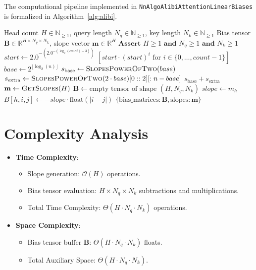 \documentclass[11pt,a4paper]{article}
\theoremstyle{definition}
\begin{document}
The computational pipeline implemented in \texttt{NnAlgoAlibiAttentionLinearBiases} is formalized in Algorithm~\ref{alg:alibi}.

\begin{algorithm}[H]
\caption{ALiBi Bias Tensor Evaluation}
\label{alg:alibi}
\begin{algorithmic}[1]
\Require Head count $H \in \mathbb{N}_{\ge 1}$, query length $N_q \in \mathbb{N}_{\ge 1}$, key length $N_k \in \mathbb{N}_{\ge 1}$
\Ensure Bias tensor $\mathbf{B} \in \mathbb{R}^{H \times N_q \times N_k}$, slope vector $\mathbf{m} \in \mathbb{R}^H$
\State $\textbf{Assert } H \ge 1 \textbf{ and } N_q \ge 1 \textbf{ and } N_k \ge 1$
        \State $start \gets 2.0^{-\left(2.0^{-(\log_2(count) - 3)}\right)}$
        \State \Return $[start \cdot (start)^i \text{ for } i \in \{0, \dots, count - 1\}]$
    \EndFunction
        \State \Return {}
    \EndIf
    \State $base \gets 2^{\lfloor \log_2(n) \rfloor}$
    \State $s_{\text{base}} \gets \Call{SlopesPowerOfTwo}{base}$
    \State $s_{\text{extra}} \gets \Call{SlopesPowerOfTwo}{2 \cdot base}[0::2][: n - base]$
    \State \Return $s_{\text{base}} + s_{\text{extra}}$
\EndFunction
\State $\mathbf{m} \gets \Call{GetSlopes}{H}$
\State $\mathbf{B} \gets \text{empty tensor of shape } (H, N_q, N_k)$
    \State $slope \gets m_h$
            \State $B[h, i, j] \gets -slope \cdot \text{float}(|i - j|)$
        \EndFor
    \EndFor
\EndFor
\State \Return $\{\text{bias\_matrices}: \mathbf{B}, \text{slopes}: \mathbf{m}\}$
\end{algorithmic}
\end{algorithm}

\section{Complexity Analysis}
\begin{itemize}
    \item \textbf{Time Complexity}:
    \begin{itemize}
        \item Slope generation: $\mathcal{O}(H)$ operations.
        \item Bias tensor evaluation: $H \times N_q \times N_k$ subtractions and multiplications.
        \item Total Time Complexity: $\Theta(H \cdot N_q \cdot N_k)$ operations.
    \end{itemize}
    \item \textbf{Space Complexity}:
    \begin{itemize}
        \item Bias tensor buffer $\mathbf{B}$: $\Theta(H \cdot N_q \cdot N_k)$ floats.
        \item Total Auxiliary Space: $\Theta(H \cdot N_q \cdot N_k)$.
    \end{itemize}
\end{itemize}
\end{document}

